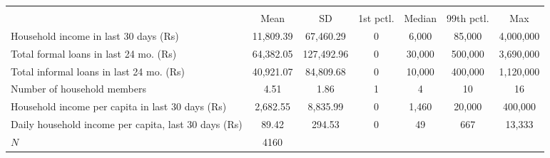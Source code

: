 {
\def\sym#1{\ifmmode^{#1}\else\(^{#1}\)\fi}
\begin{tabular}{l*{1}{cccccc}}
\hline\hline
            &\multicolumn{6}{c}{}                                                         \\
            &        Mean&          SD&   1st pctl.&      Median&  99th pctl.&         Max\\
\hline
Household income in last 30 days (Rs)&   11,809.39&   67,460.29&           0&       6,000&      85,000&   4,000,000\\
Total formal loans in last 24 mo. (Rs)&   64,382.05&  127,492.96&           0&      30,000&     500,000&   3,690,000\\
Total informal loans in last 24 mo. (Rs)&   40,921.07&   84,809.68&           0&      10,000&     400,000&   1,120,000\\
Number of household members&        4.51&        1.86&           1&           4&          10&          16\\
Household income per capita in last 30 days (Rs)&    2,682.55&    8,835.99&           0&       1,460&      20,000&     400,000\\
Daily household income per capita, last 30 days (Rs)&       89.42&      294.53&           0&          49&         667&      13,333\\
\hline
\(N\)       &        4160&            &            &            &            &            \\
\hline\hline
\end{tabular}
}
